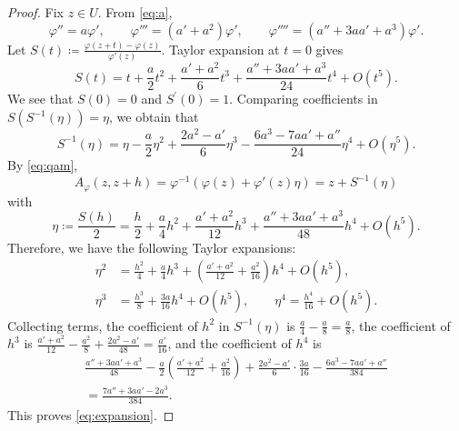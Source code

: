 \documentclass[10pt,a4paper]{amsart}
\begin{document}
\begin{proof}
Fix $z \in U$.
From \eqref{eq:a},
\begin{equation*}
\varphi'' = a \varphi', \qquad \varphi''' = (a' + a^2) \varphi', \qquad \varphi'''' = (a'' + 3aa' + a^3) \varphi' .
\end{equation*}
Let $S(t) \coloneqq  \frac{\varphi(z+t) - \varphi(z)}{\varphi'(z)}$. 
Taylor expansion at $t = 0$ gives
\begin{equation*}
S(t) = t + \frac{a}{2} t^2 + \frac{a' + a^2}{6} t^3 + \frac{a'' + 3aa' + a^3}{24} t^4 + O(t^5) .
\end{equation*}
We see that $S(0) = 0$ and $S^{\prime}(0) = 1$. 
Comparing coefficients in $S(S^{-1}(\eta)) = \eta$, we obtain that 
\begin{equation*}
S^{-1}(\eta) = \eta - \frac{a}{2}\eta^2 + \frac{2a^2 - a'}{6} \eta^3 - \frac{6a^3 - 7aa' + a''}{24} \eta^4 + O(\eta^5) .
\end{equation*}
By \eqref{eq:qam}, 
\[ A_{\varphi}(z, z+h) = \varphi^{-1}\left( \varphi(z) + \varphi'(z) \eta \right) = z + S^{-1}(\eta)\] 
with
\begin{equation*}
\eta \coloneqq  \frac{S(h)}{2} = \frac{h}{2} + \frac{a}{4} h^2 + \frac{a'+a^2}{12} h^3 + \frac{a'' + 3aa' + a^3}{48} h^4 + O(h^5) .
\end{equation*}
Therefore, we have the following Taylor expansions: 
\begin{align*}
\eta^2 &= \frac{h^2}{4} + \frac{a}{4} h^3 + \left( \frac{a'+a^2}{12} + \frac{a^2}{16} \right) h^4 + O(h^5), \\
\eta^3 &= \frac{h^3}{8} + \frac{3a}{16} h^4 + O(h^5), \qquad
\eta^4 = \frac{h^4}{16} + O(h^5) .
\end{align*}
Collecting terms, the coefficient of $h^2$ in $S^{-1}(\eta)$ is $\frac{a}{4} - \frac{a}{8} = \frac{a}{8}$,
the coefficient of $h^3$ is $\frac{a'+a^2}{12} - \frac{a^2}{8} + \frac{2a^2 - a'}{48} = \frac{a'}{16}$,
and the coefficient of $h^4$ is
\begin{multline*}
\frac{a'' + 3aa' + a^3}{48} - \frac{a}{2}\left( \frac{a'+a^2}{12} + \frac{a^2}{16} \right) + \frac{2a^2 - a'}{6} \cdot \frac{3a}{16} - \frac{6a^3 - 7aa' + a''}{384} \\
= \frac{7a'' + 3aa' - 2a^3}{384} .
\end{multline*}
This proves \eqref{eq:expansion}.
\end{proof}
\end{document}
